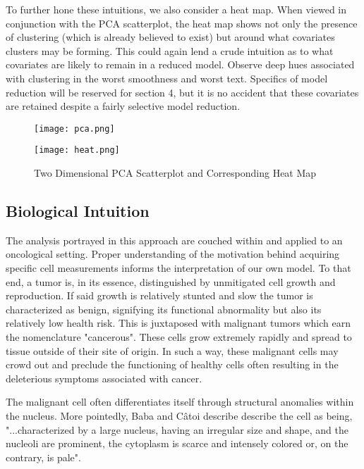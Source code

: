 \documentclass[11pt]{article}
\begin{document}
	To further hone these intuitions, we also consider a heat map.  When viewed in conjunction with the PCA scatterplot, the heat map shows not only the presence of clustering (which is already believed to exist) but around what covariates clusters may be forming.  This could again lend a crude intuition as to what covariates are likely to remain in a reduced model.   Observe deep hues associated with clustering in the worst smoothness and worst text.  Specifics of model reduction will be reserved for section 4, but it is no accident that these covariates are retained despite a fairly selective model reduction.  
	
	
\begin{figure}[htbp]
\centering
\begin{minipage}{.5\textwidth}
	\centering
	\texttt{[image: pca.png]}
\end{minipage}%
\begin{minipage}{.5\textwidth}
	\centering
	\texttt{[image: heat.png]}
\end{minipage}%
\caption{Two Dimensional PCA Scatterplot and Corresponding Heat Map}\label{fig:heat}
\end{figure}

\subsection{Biological Intuition}

	The analysis portrayed in this approach are couched within and applied to an oncological setting.   Proper understanding of the motivation behind acquiring specific cell measurements informs the interpretation of our own model.  To that end, a tumor is, in its essence, distinguished by unmitigated cell growth and reproduction.  If said growth is relatively stunted and slow the tumor is characterized as benign, signifying its functional abnormality but also its relatively low health risk.  This is juxtaposed with malignant tumors which earn the nomenclature "cancerous".  These cells grow extremely rapidly and spread to tissue outside of their site of origin.  In such a way, these malignant cells may crowd out and preclude the functioning of healthy cells often resulting in the deleterious symptoms associated with cancer.   
	
	The malignant cell often differentiates itself through structural anomalies within the nucleus.  More pointedly, Baba and  Câtoi describe describe the cell as being, "...characterized by a large nucleus, having an irregular size and shape, and the nucleoli are prominent, the cytoplasm is scarce and intensely colored or, on the contrary, is pale".  
	
\end{document}
